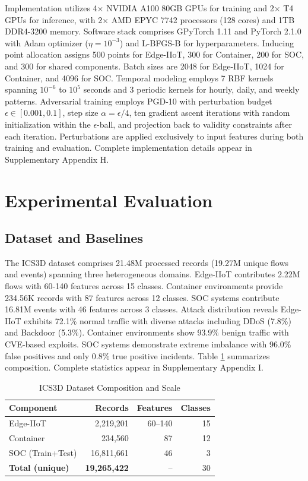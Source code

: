 \documentclass[review,12pt]{elsarticle}
\begin{document}
Implementation utilizes 4× NVIDIA A100 80GB GPUs for training and 2× T4 GPUs for inference, with 2× AMD EPYC 7742 processors (128 cores) and 1TB DDR4-3200 memory. Software stack comprises GPyTorch 1.11 and PyTorch 2.1.0 with Adam optimizer ($\eta=10^{-3}$) and L-BFGS-B for hyperparameters. Inducing point allocation assigns 500 points for Edge-IIoT, 300 for Container, 200 for SOC, and 300 for shared components. Batch sizes are 2048 for Edge-IIoT, 1024 for Container, and 4096 for SOC. Temporal modeling employs 7 RBF kernels spanning $10^{-6}$ to $10^5$ seconds and 3 periodic kernels for hourly, daily, and weekly patterns. Adversarial training employs PGD-10 with perturbation budget $\epsilon \in [0.001, 0.1]$, step size $\alpha = \epsilon/4$, ten gradient ascent iterations with random initialization within the $\epsilon$-ball, and projection back to validity constraints after each iteration. Perturbations are applied exclusively to input features during both training and evaluation. Complete implementation details appear in Supplementary Appendix H.

\section{Experimental Evaluation}

\subsection{Dataset and Baselines}

The ICS3D dataset \cite{RNA2025datasets} comprises 21.48M processed records (19.27M unique flows and events) spanning three heterogeneous domains. Edge-IIoT contributes 2.22M flows with 60-140 features across 15 classes. Container environments provide 234.56K records with 87 features across 12 classes. SOC systems contribute 16.81M events with 46 features across 3 classes. Attack distribution reveals Edge-IIoT exhibits 72.1\% normal traffic with diverse attacks including DDoS (7.8\%) and Backdoor (5.3\%). Container environments show 93.9\% benign traffic with CVE-based exploits. SOC systems demonstrate extreme imbalance with 96.0\% false positives and only 0.8\% true positive incidents. Table \ref{tab:dataset_stats} summarizes composition. Complete statistics appear in Supplementary Appendix I.

\begin{table}[!t]
\centering
\caption{ICS3D Dataset Composition and Scale}
\label{tab:dataset_stats}
\begin{tabular}{lrrr}
\toprule
\textbf{Component} & \textbf{Records} & \textbf{Features} & \textbf{Classes} \\
\midrule
Edge-IIoT & 2,219,201 & 60--140 & 15 \\
Container & 234,560 & 87 & 12 \\
SOC (Train+Test) & 16,811,661 & 46 & 3 \\
\textbf{Total (unique)} & \textbf{19,265,422} & -- & 30 \\
\bottomrule
\end{tabular}
\end{table}
\end{document}
